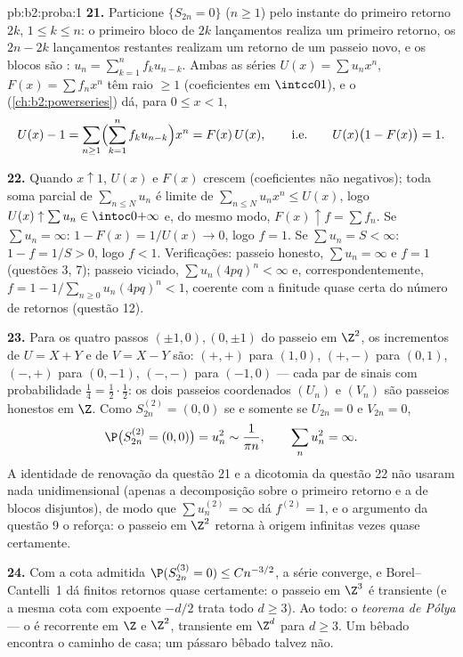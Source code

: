 \begin{solution}{pb:b2:proba:1}
\textbf{21.} Particione $\{S_{2n} = 0\}$ ($n \geq 1$) pelo
instante do primeiro retorno $2k$, $1 \leq k \leq n$: o primeiro bloco de
$2k$ lançamentos realiza um primeiro retorno, os $2n - 2k$ lançamentos
restantes realizam um retorno de um passeio novo, e os blocos são
: $u_n = \sum_{k=1}^nf_ku_{n-k}$. Ambas as séries
$U(x) = \sum u_nx^n$, $F(x) = \sum f_nx^n$ têm raio $\geq
1$ (coeficientes em $\intcc01$), e o 
(\cref{ch:b2:powerseries}) dá, para $0 \leq x < 1$,
\[
U(x) - 1 = \sum_{n\geq1}\Bigl(\sum_{k=1}^n
f_ku_{n-k}\Bigr)x^n = F(x)\,U(x),
\qquad\text{i.e.}\qquad
U(x)\bigl(1 - F(x)\bigr) = 1 .
\]

\textbf{22.} Quando $x \uparrow 1$, $U(x)$ e $F(x)$ crescem
(coeficientes não negativos); toda soma parcial de $\sum_{n\leq
N}u_n$ é limite de $\sum_{n\leq N}u_nx^n \leq U(x)$, logo
$U(x) \uparrow \sum u_n \in \intoc0{+\infty}$ e, do mesmo modo,
$F(x) \uparrow f = \sum f_n$. Se $\sum u_n = \infty$: $1 -
F(x) = 1/U(x) \to 0$, logo $f = 1$. Se $\sum u_n = S < \infty$:
$1 - f = 1/S > 0$, logo $f < 1$. Verificações: passeio honesto, $\sum u_n =
\infty$ e $f = 1$ (questões 3, 7); passeio viciado, $\sum
u_n(4pq)^n < \infty$ e, correspondentemente, $f = 1 -
1/\sum_{n\geq0}u_n(4pq)^n < 1$, coerente com a
finitude quase certa do número de retornos (questão
12).

\textbf{23.} Para os quatro passos $(\pm1, 0), (0, \pm1)$ do
passeio em $\Z^2$, os incrementos de $U = X + Y$ e de $V = X - Y$
são: $(+,+)$ para $(1,0)$, $(+,-)$ para $(0,1)$, $(-,+)$ para
$(0,-1)$, $(-,-)$ para $(-1,0)$ --- cada par de sinais com
probabilidade $\frac14 = \frac12\cdot\frac12$: os dois
passeios coordenados $(U_n)$ e $(V_n)$ são passeios honestos
 em $\Z$. Como $S^{(2)}_{2n} = (0,0)$ se e somente se $U_{2n} = 0$
e $V_{2n} = 0$,
\[
\P\bigl(S^{(2)}_{2n} = (0,0)\bigr) = u_n^2 \sim \frac1{\pi
n}, \qquad \sum_nu_n^2 = \infty .
\]
A identidade de renovação da questão 21 e a dicotomia da
questão 22 não usaram nada unidimensional (apenas a
decomposição sobre o primeiro retorno e a  de blocos
disjuntos), de modo que $\sum u_n^{(2)} = \infty$ dá $f^{(2)} =
1$, e o argumento da questão 9 o reforça: o passeio em
$\Z^2$ retorna à origem infinitas vezes quase certamente.

\textbf{24.} Com a cota admitida $\P(S^{(3)}_{2n} = 0)
\leq Cn^{-3/2}$, a série converge, e Borel--Cantelli~1
dá finitos retornos quase certamente: o passeio em
$\Z^3$ é transiente (e a mesma cota com expoente $-d/2$
trata todo $d \geq 3$). Ao todo: o \emph{teorema de
Pólya} --- o  é recorrente em $\Z$ e
$\Z^2$, transiente em $\Z^d$ para $d \geq 3$. Um bêbado encontra
o caminho de casa; um pássaro bêbado talvez não.


\end{solution}
